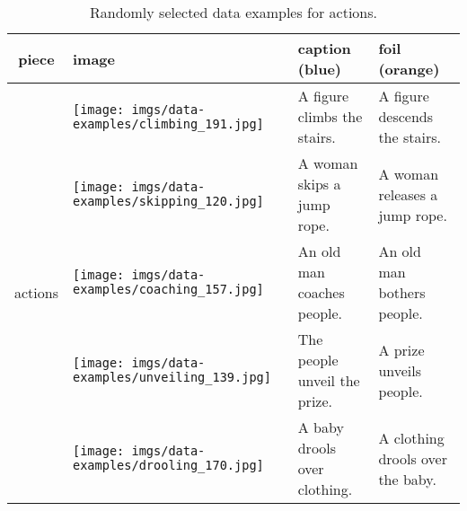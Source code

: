 \documentclass[11pt]{article}
\newcommand{\gr}[1]{\textcolor{niceblue}{#1}}
\newcommand\red[1]{\textcolor{niceorange}{#1}}
\begin{document}
\begin{table*}[t]
    \small
    \centering
    
\begin{tabular}{cp{.3\linewidth}b{.25\linewidth}b{.25\linewidth}}
      \toprule
    \bf piece & \bf image & \bf caption (\gr{blue}) & \bf foil (\red{orange}) \\
    \midrule
    \multirow{5}{*}{actions} & \texttt{[image: imgs/data-examples/climbing\_191.jpg]}
      & A figure \gr{climbs} the stairs. & A figure \red{descends} the stairs. \\
      \cmidrule{2-4}
      & \texttt{[image: imgs/data-examples/skipping\_120.jpg]}
      & A woman \gr{skips} a jump rope. & A woman \red{releases} a jump rope.\\
      \cmidrule{2-4}
      & \texttt{[image: imgs/data-examples/coaching\_157.jpg]}
      & An old man \gr{coaches} people. & An old man \red{bothers} people. \\
      \cmidrule{2-4}
      & \texttt{[image: imgs/data-examples/unveiling\_139.jpg]}
      & \gr{The people} unveil \gr{the prize}. & \red{A prize} unveils \red{people}. \\
      \cmidrule{2-4}
    & \texttt{[image: imgs/data-examples/drooling\_170.jpg]}
      & \gr{A baby drools} over clothing. & \red{A clothing} drools over \red{the baby}. \\
      \bottomrule
    \end{tabular}
\caption{Randomly selected data examples for actions.}
    \label{tab:actions-examples}
\end{table*}
\end{document}

